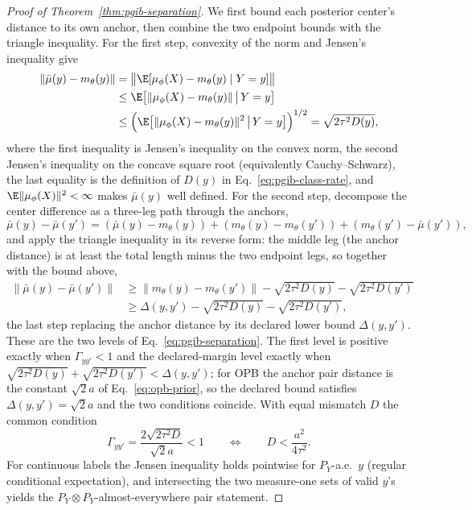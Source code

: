 \begin{proof}[Proof of Theorem~\ref{thm:pgib-separation}]
We first bound each posterior center's distance to its own anchor, then combine the
two endpoint bounds with the triangle inequality. For the first step, convexity of
the norm and Jensen's inequality give
\begin{equation*}
\begin{aligned}
\|\bar\mu(y) - m_\theta(y)\|
&= \bigl\|\E[\mu_\phi(X)-m_\theta(y)\mid Y=y]\bigr\|\\
&\le \E\bigl[\|\mu_\phi(X)-m_\theta(y)\|\,\big|\,Y=y\bigr]\\
&\le \Bigl(\E\bigl[\|\mu_\phi(X)-m_\theta(y)\|^2\,\big|\,Y=y\bigr]\Bigr)^{1/2}
= \sqrt{2\tau^2 D(y)},
\end{aligned}
\end{equation*}
where the first inequality is Jensen's inequality on the convex norm, the second
Jensen's inequality on the concave square root (equivalently Cauchy--Schwarz), the
last equality is the definition of $D(y)$ in
Eq.~\eqref{eq:pgib-class-rate}, and
$\E\|\mu_\phi(X)\|^2<\infty$ makes $\bar\mu(y)$ well defined. For the second
step, decompose the center difference as a three-leg path through the anchors,
\begin{equation*}
\bar\mu(y) - \bar\mu(y') = (\bar\mu(y) - m_\theta(y)) + (m_\theta(y) - m_\theta(y'))
+ (m_\theta(y') - \bar\mu(y')),
\end{equation*}
and apply the triangle inequality in its reverse form: the middle leg (the anchor
distance) is at least the total length minus the two endpoint legs, so together
with the bound above,
\begin{equation*}
\begin{aligned}
\|\bar\mu(y)-\bar\mu(y')\|
&\ge \|m_\theta(y)-m_\theta(y')\|-\sqrt{2\tau^2D(y)}-\sqrt{2\tau^2D(y')}\\
&\ge \Delta(y,y')-\sqrt{2\tau^2D(y)}-\sqrt{2\tau^2D(y')},
\end{aligned}
\end{equation*}
the last step replacing the anchor distance by its declared lower bound
$\Delta(y,y')$. These are the two levels of Eq.~\eqref{eq:pgib-separation}. The
first level is positive exactly
when $\Gamma_{yy'}<1$ and the declared-margin level exactly when
$\sqrt{2\tau^2D(y)}+\sqrt{2\tau^2D(y')}<\Delta(y,y')$; for OPB the
anchor pair distance is the constant $\sqrt2a$ of
Eq.~\eqref{eq:opb-prior}, so the declared bound satisfies $\Delta(y,y')=\sqrt2a$ and
the two conditions coincide. With equal mismatch $D$ the common condition
\begin{equation*}
\Gamma_{yy'}=\frac{2\sqrt{2\tau^2D}}{\sqrt2a}<1
\qquad\Longleftrightarrow\qquad
D<\frac{a^2}{4\tau^2}.
\end{equation*}
For continuous labels the Jensen inequality holds
pointwise for $P_Y$-a.e.\ $y$ (regular conditional expectation), and intersecting
the two measure-one sets of valid $y$'s yields the $P_Y\otimes P_Y$-almost-everywhere
pair statement.
\end{proof}

